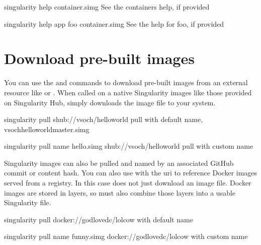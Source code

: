 \documentclass[letterpaper,10pt,english]{sphinxmanual}
\begin{document}
%
\begin{sphinxVerbatim}[commandchars=\\\{\}]
\PYGZdl{} singularity help container.simg            \PYGZsh{} See the container\PYGZsq{}s help, if provided

\PYGZdl{} singularity help \PYGZhy{}\PYGZhy{}app foo container.simg  \PYGZsh{} See the help for foo, if provided
\end{sphinxVerbatim}


\section{Download pre-built images}
\label{\detokenize{quick_start:download-pre-built-images}}
You can use the {\hyperref[\detokenize{appendix:pull-command}]{}} and {\hyperref[\detokenize{appendix:build-command}]{}} commands to download pre-built images from an
external resource like  or . When called
on a native Singularity images like those provided on Singularity Hub, 
simply downloads the image file to your system.

%
\begin{sphinxVerbatim}[commandchars=\\\{\}]
\PYGZdl{} singularity pull shub://vsoch/hello\PYGZhy{}world   \PYGZsh{} pull with default name, vsoch\PYGZhy{}hello\PYGZhy{}world\PYGZhy{}master.simg

\PYGZdl{} singularity pull \PYGZhy{}\PYGZhy{}name hello.simg shub://vsoch/hello\PYGZhy{}world   \PYGZsh{} pull with custom name
\end{sphinxVerbatim}

Singularity images can also be pulled and named by an associated
GitHub commit or content hash.
You can also use  with the  uri to reference Docker images served from a
registry. In this case  does not just download an image file. Docker
images are stored in layers, so  must also combine those layers into a
usable Singularity file.

%
\begin{sphinxVerbatim}[commandchars=\\\{\}]
\PYGZdl{} singularity pull docker://godlovedc/lolcow  \PYGZsh{} with default name

\PYGZdl{} singularity pull \PYGZhy{}\PYGZhy{}name funny.simg docker://godlovedc/lolcow \PYGZsh{} with custom name
\end{sphinxVerbatim}
\end{document}
